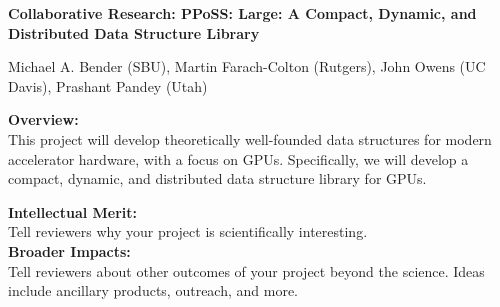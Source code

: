 \begin{center}
\bf
\Large
Collaborative Research: PPoSS: Large: A Compact, Dynamic, and Distributed Data
Structure Library

\medskip
\small
Michael A. Bender (SBU), Martin Farach-Colton (Rutgers), John Owens (UC Davis),
Prashant Pandey (Utah)
\end{center}


\noindent \textbf{\large Overview:}\\

\noindent This project will develop theoretically well-founded data structures for modern accelerator hardware, with a focus on GPUs. Specifically, we will develop a compact, dynamic, and distributed data structure library for GPUs.


\noindent \textbf{\large Intellectual Merit:}\\

\noindent Tell reviewers why your project is scientifically interesting.\\

\noindent \textbf{\large Broader Impacts: }\\

\noindent Tell reviewers about other outcomes of your project beyond the science. Ideas include ancillary products, outreach, and more.
